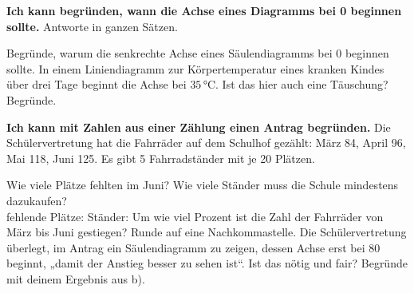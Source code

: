 \begin{aufgabe}{\textbf{Ich kann begründen, wann die Achse eines Diagramms bei 0 beginnen sollte.} Antworte in ganzen Sätzen.}
\begin{teile}
\teil Begründe, warum die senkrechte Achse eines Säulendiagramms bei 0 beginnen sollte.
\teil In einem Liniendiagramm zur Körpertemperatur eines kranken Kindes über drei Tage beginnt die Achse bei $35\,°$C. Ist das hier auch eine Täuschung? Begründe.
\end{teile}
\end{aufgabe}

\begin{aufgabe}{\textbf{Ich kann mit Zahlen aus einer Zählung einen Antrag begründen.} Die Schülervertretung hat die Fahrräder auf dem Schulhof gezählt: März 84, April 96, Mai 118, Juni 125. Es gibt 5 Fahrradständer mit je 20 Plätzen.}
\begin{teile}
\teil Wie viele Plätze fehlten im Juni? Wie viele Ständer muss die Schule mindestens dazukaufen?\\ fehlende Plätze: \leerfeld \quad Ständer: \leerfeld
\teil Um wie viel Prozent ist die Zahl der Fahrräder von März bis Juni gestiegen? Runde auf eine Nachkommastelle. \leerfeld[\%]
\teil Die Schülervertretung überlegt, im Antrag ein Säulendiagramm zu zeigen, dessen Achse erst bei 80 beginnt, „damit der Anstieg besser zu sehen ist“. Ist das nötig und fair? Begründe mit deinem Ergebnis aus b).
\end{teile}
\end{aufgabe}
